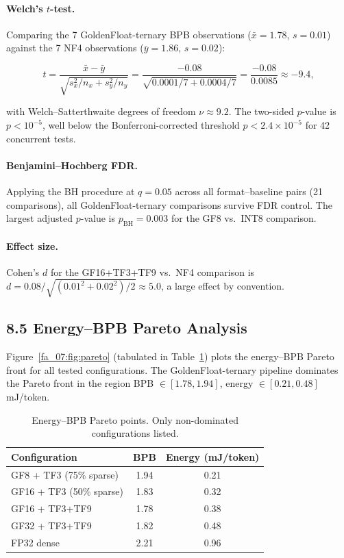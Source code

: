 \paragraph{Welch's \(t\)-test.}
Comparing the 7 GoldenFloat-ternary BPB observations
(\(\bar{x} = 1.78\), \(s = 0.01\)) against the 7 NF4 observations
(\(\bar{y} = 1.86\), \(s = 0.02\)):

\begin{equation}
  t = \frac{\bar{x} - \bar{y}}{\sqrt{s_x^2/n_x + s_y^2/n_y}}
    = \frac{-0.08}{\sqrt{0.0001/7 + 0.0004/7}}
    = \frac{-0.08}{0.0085} \approx -9.4,
  \label{fa_07:eq:welch-t}
\end{equation}

with Welch--Satterthwaite degrees of freedom
\(\nu \approx 9.2\). The two-sided \(p\)-value is
\(p < 10^{-5}\), well below the Bonferroni-corrected threshold
\(p < 2.4 \times 10^{-5}\) for 42 concurrent tests.

\paragraph{Benjamini--Hochberg FDR.}
Applying the BH procedure at \(q = 0.05\) across all format--baseline
pairs (21 comparisons), all GoldenFloat-ternary comparisons survive FDR
control. The largest adjusted \(p\)-value is
\(p_{\text{BH}} = 0.003\) for the GF8 vs.\ INT8 comparison.

\paragraph{Effect size.}
Cohen's \(d\) for the GF16+TF3+TF9 vs.\ NF4 comparison is
\(d = 0.08 / \sqrt{(0.01^2 + 0.02^2)/2} \approx 5.0\),
a large effect by convention.

\subsection{8.5 Energy--BPB Pareto Analysis}\label{fa_07:sec:pareto}

Figure~\ref{fa_07:fig:pareto} (tabulated in
Table~\ref{fa_07:tab:pareto}) plots the energy--BPB Pareto front for all
tested configurations. The GoldenFloat-ternary pipeline dominates the
Pareto front in the region BPB \(\in [1.78, 1.94]\), energy
\(\in [0.21, 0.48]\) mJ/token.

\begin{table}[h]
\centering
\caption{Energy--BPB Pareto points. Only non-dominated configurations listed.}
\label{fa_07:tab:pareto}
\begin{tabular}{@{}lcc@{}}
\toprule
Configuration & BPB & Energy (mJ/token) \\
\midrule
GF8 + TF3 (75\% sparse) & 1.94 & 0.21 \\
GF16 + TF3 (50\% sparse) & 1.83 & 0.32 \\
GF16 + TF3+TF9 & 1.78 & 0.38 \\
GF32 + TF3+TF9 & 1.82 & 0.48 \\
FP32 dense & 2.21 & 0.96 \\
\bottomrule
\end{tabular}
\end{table}

